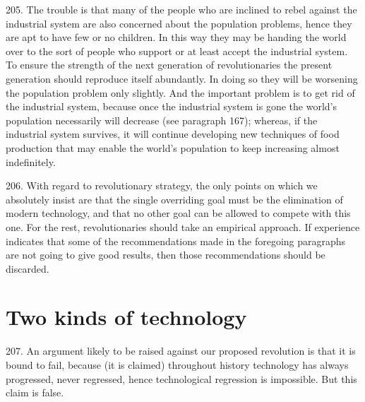 \documentclass{article}
\begin{document}
205.  The trouble is that many of the people who are inclined to rebel against the industrial system 
are also concerned about the population problems, hence they are apt to have few or no children.  In 
this way they may be handing the world over to the sort of people who support or at least accept 
the industrial system.  To ensure the strength of the next generation of revolutionaries the present 
generation should reproduce itself abundantly.  In doing so they will be worsening the population 
problem only slightly.  And the important problem is to get rid of the industrial system, because 
once the industrial system is gone the world’s population necessarily will decrease (see paragraph 
167); whereas, if the industrial system survives, it will continue developing new techniques of food 
production that may enable the world’s population to keep increasing almost indefinitely. \vspace{\baselineskip}

206.  With regard to revolutionary strategy, the only points on which we absolutely insist are that 
the single overriding goal must be the elimination of modern technology, and that no other goal 
can be  allowed to compete with this one.  For the rest, revolutionaries should take an empirical 
approach.   If  experience  indicates  that  some  of  the  recommendations  made  in  the  foregoing  
paragraphs are not going to give good results, then those recommendations should be discarded. 


\section{Two kinds of technology}

\hspace{0.5cm} 207.  An argument likely to be raised  against our  proposed revolution is that it is bound to fail, 
because  (it  is  claimed)  throughout  history  technology  has  always  progressed,  never  regressed,  
hence technological regression is impossible.  But this claim is false. \vspace{\baselineskip}
\end{document}
